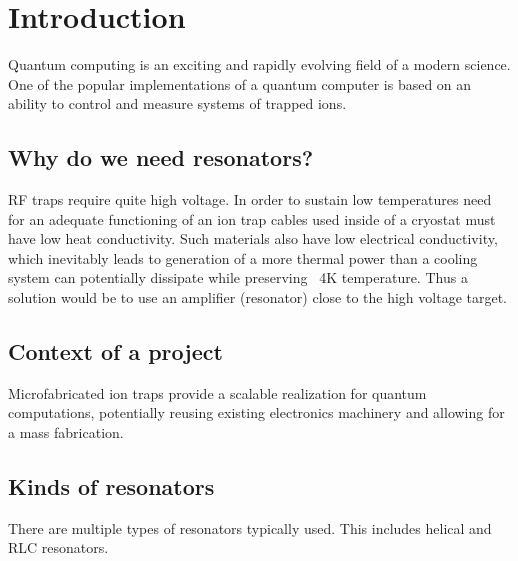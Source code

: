 \newcommand{\package}{\emph}

\chapter{Introduction}
Quantum computing is an exciting and rapidly evolving field of a modern science. One of the popular implementations of a quantum computer is based on an ability to control and measure systems of trapped ions.
\section{Why do we need resonators?}
\label{sec:why_resonators}
RF traps require quite high voltage. In order to sustain low temperatures need for an adequate functioning of an ion trap cables used inside of a cryostat must have low heat conductivity. Such materials also have low electrical conductivity, which inevitably leads to generation of a more thermal power than a cooling system can potentially dissipate while preserving ~4K temperature. Thus a solution would be to use an amplifier (resonator) close to the high voltage target.
\section{Context of a project}
\label{sec:context}
Microfabricated ion traps provide a scalable realization for quantum computations, potentially reusing existing electronics machinery and allowing for a mass fabrication.
\section{Kinds of resonators}
\label{sec:kinds_resonators}
There are multiple types of resonators typically used. This includes helical and RLC resonators.